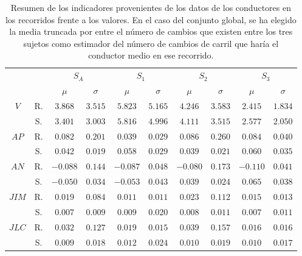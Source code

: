 \begin{table}
	\centering
	\small
	\caption[Indicadores reales frente a indicadores capturados en simulación]{Resumen de los indicadores provenientes de los datos de los conductores en los recorridos frente a los valores. En el caso del conjunto global, se ha elegido la media truncada por entre el número de cambios que existen entre los tres sujetos como estimador del número de cambios de carril que haría el conductor medio en ese recorrido.}
	\label{tbl:global-comparison-indicators}
	\begin{tabular}{cccccccccc}
		\centering
		&                   & \multicolumn{2}{c}{$S_A$}    & \multicolumn{2}{c}{$S_1$}          & \multicolumn{2}{c}{$S_2$}        & \multicolumn{2}{c}{\textbf{$S_3$}}        \\
		\multicolumn{2}{l}{}                  & $\mu$     & $\sigma$ & $\mu$    & $\sigma$ & $\mu$     & $\sigma$  & $\mu$    & $\sigma$ \\
		\hline
		\multirow{2}{*}{\textbf{$V$}}   & R. & $3.868$  & $3.515$  & $5.823$  & $5.165$  & $4.246$  & $3.583$  & $2.415$  & $1.834$  \\
		                                & S. & $3.401$  & $3.003$  & $5.816$  & $4.996$  & $4.111$  & $3.515$  & $2.577$  & $2.050$  \\
		\multirow{2}{*}{\textbf{$AP$}}  & R. & $0.082$  & $0.201$  & $0.039$  & $0.029$  & $0.086$  & $0.260$  & $0.084$  & $0.040$  \\
		                                & S. & $0.042$  & $0.019$  & $0.058$  & $0.029$  & $0.039$  & $0.021$  & $0.060$  & $0.035$  \\
		\multirow{2}{*}{\textbf{$AN$}}  & R. & $-0.088$ & $0.144$  & $-0.087$ & $0.048$  & $-0.080$ & $0.173$  & $-0.110$ & $0.041$  \\
		                                & S. & $-0.050$ & $0.034$  & $-0.053$ & $0.043$  & $0.039$  & $0.024$  & $0.065$  & $0.038$  \\
		\multirow{2}{*}{\textbf{$JIM$}} & R. & $0.019$  & $0.084$  & $0.011$  & $0.011$  & $0.023$  & $0.112$  & $0.015$  & $0.013$  \\
		                                & S. & $0.007$  & $0.009$  & $0.009$  & $0.020$  & $0.008$  & $0.011$  & $0.007$  & $0.011$  \\
		\multirow{2}{*}{\textbf{$JLC$}} & R. & $0.032$  & $0.127$  & $0.019$  & $0.015$  & $0.039$  & $0.157$  & $0.016$  & $0.016$  \\
		                                & S. & $0.009$  & $0.018$  & $0.012$  & $0.024$  & $0.010$  & $0.019$  & $0.010$  & $0.017$  \\

\end{tabular}
\end{table}
